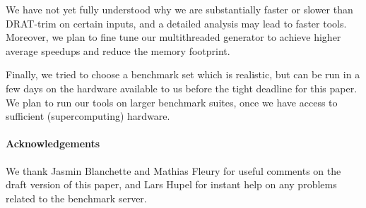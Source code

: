 \documentclass{llncs}
\begin{document}
We have not yet fully understood why we are substantially faster or slower than DRAT-trim on certain inputs,
and a detailed analysis may lead to faster tools. Moreover, we plan to fine tune our multithreaded generator to achieve higher average speedups and reduce the memory footprint.

Finally, we tried to choose a benchmark set which is realistic, but can be run in a few days on the hardware available to us before the tight deadline for this paper.
We plan to run our tools on larger benchmark suites, once we have access to sufficient (supercomputing) hardware.

\paragraph{Acknowledgements} We thank Jasmin Blanchette and Mathias Fleury for useful comments on the draft version of this paper, 
and Lars Hupel for instant help on any problems related to the benchmark server.

\clearpage



\end{document}
